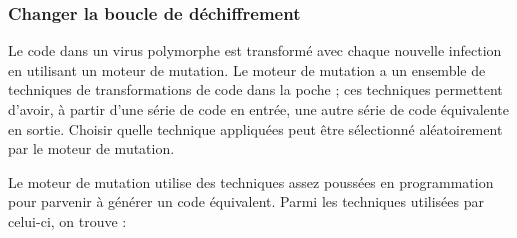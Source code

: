         \subsubsection{Changer la boucle de déchiffrement}
        Le code dans un virus polymorphe est transformé avec chaque nouvelle infection en utilisant un moteur de
        mutation. Le moteur de mutation a un ensemble de techniques de transformations de code dans la poche ; 
        ces techniques permettent d'avoir, à partir d'une série de code en entrée, une autre série de code 
        équivalente en sortie. Choisir quelle technique appliquées peut être sélectionné aléatoirement 
        par le moteur de mutation. \cite{virus} %

        Le moteur de mutation utilise des techniques assez poussées en programmation pour 
        parvenir à générer un code équivalent. Parmi les techniques utilisées par celui-ci, on trouve : %
        \cite{virus}
